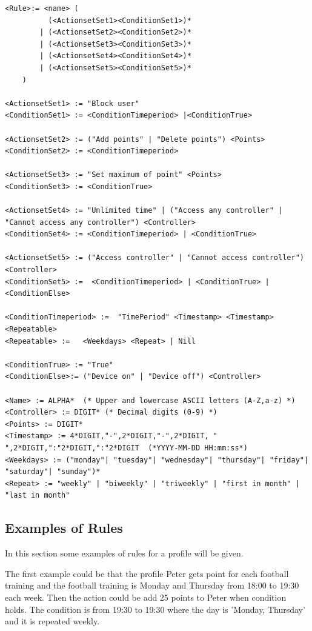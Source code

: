 \begin{lstlisting}[label=grammar2, caption=Grammar of a rule in EBNF]
<Rule>:= <name> (
	 	  (<ActionsetSet1><ConditionSet1>)*
		| (<ActionsetSet2><ConditionSet2>)*
		| (<ActionsetSet3><ConditionSet3>)*
		| (<ActionsetSet4><ConditionSet4>)*
		| (<ActionsetSet5><ConditionSet5>)*
	)

<ActionsetSet1> := "Block user" 
<ConditionSet1> := <ConditionTimeperiod> |<ConditionTrue>

<ActionsetSet2> := ("Add points" | "Delete points") <Points>
<ConditionSet2> := <ConditionTimeperiod>

<ActionsetSet3> := "Set maximum of point" <Points>
<ConditionSet3> := <ConditionTrue>

<ActionsetSet4> := "Unlimited time" | ("Access any controller" | "Cannot access any controller") <Controller>
<ConditionSet4> := <ConditionTimeperiod> | <ConditionTrue> 

<ActionsetSet5> := ("Access controller" | "Cannot access controller")<Controller>
<ConditionSet5> :=	<ConditionTimeperiod> |	<ConditionTrue>	|	<ConditionElse>	
				
<ConditionTimeperiod> :=  "TimePeriod" <Timestamp> <Timestamp> <Repeatable>					
<Repeatable> :=   <Weekdays> <Repeat> | Nill

<ConditionTrue> := "True" 
<ConditionElse>:= ("Device on" | "Device off") <Controller>
				
<Name> := ALPHA*  (* Upper and lowercase ASCII letters (A-Z,a-z) *)
<Controller> := DIGIT* (* Decimal digits (0-9) *)
<Points> := DIGIT*
<Timestamp> := 4*DIGIT,"-",2*DIGIT,"-",2*DIGIT, " ",2*DIGIT,":"2*DIGIT,":"2*DIGIT  (*YYYY-MM-DD HH:mm:ss*)
<Weekdays> := ("monday"| "tuesday"| "wednesday"| "thursday"| "friday"| "saturday"| "sunday")*
<Repeat> := "weekly" | "biweekly" | "triweekly" | "first in month" | "last in month"
\end{lstlisting}
		
\subsection{Examples of Rules}
In this section some examples of rules for a profile will be given.

The first example could be that the profile Peter gets point for each football training and the football training is Monday and Thursday from 18:00 to 19:30 each week. Then the action could be add 25 points to Peter when condition holds. The condition is from 19:30 to 19:30 where the day is 'Monday, Thursday' and it is repeated weekly. \\

